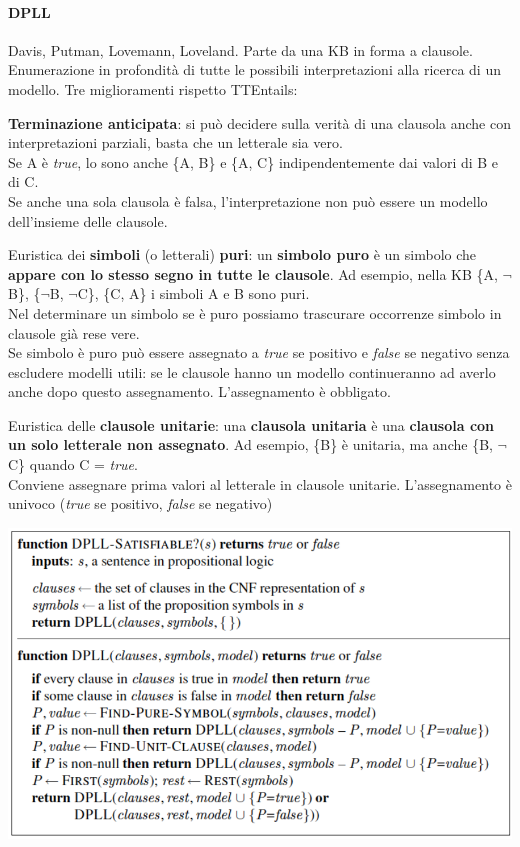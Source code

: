 \documentclass[10pt]{book}
\begin{document}
\paragraph{DPLL} Davis, Putman, Lovemann, Loveland. Parte da una KB in forma a clausole. Enumerazione in profondità di tutte le possibili interpretazioni alla ricerca di un modello. Tre miglioramenti rispetto TTEntails:
\begin{list}{}{}
	\item \textbf{Terminazione anticipata}: si può decidere sulla verità di una clausola anche con interpretazioni parziali, basta che un letterale sia vero.\\
	Se A è \textit{true}, lo sono anche \{A, B\} e \{A, C\} indipendentemente dai valori di B e di C.\\
	Se anche una sola clausola è falsa, l'interpretazione non può essere un modello dell'insieme delle clausole.
	\item Euristica dei \textbf{simboli} (o letterali) \textbf{puri}: un \textbf{simbolo puro} è un simbolo che \textbf{appare con lo stesso segno in tutte le clausole}. Ad esempio, nella KB \{A, $\neg$B\}, \{$\neg$B, $\neg$C\}, \{C, A\} i simboli A e B sono puri.\\
Nel determinare un simbolo se è puro possiamo trascurare occorrenze simbolo in clausole già rese vere.\\
	Se simbolo è puro può essere assegnato a \textit{true} se positivo e \textit{false} se negativo senza escludere modelli utili: se le clausole hanno un modello continueranno ad averlo anche dopo questo assegnamento. L'assegnamento è obbligato.
	\item Euristica delle \textbf{clausole unitarie}: una \textbf{clausola unitaria} è una \textbf{clausola con un solo letterale non assegnato}. Ad esempio, \{B\} è unitaria, ma anche \{B, $\neg$C\} quando C = \textit{true}.\\
	Conviene assegnare prima valori al letterale in clausole unitarie. L'assegnamento è univoco (\textit{true} se positivo, \textit{false} se negativo)
\end{list}
\begin{center}
	\includegraphics[scale=0.7]{dpllalgoritmo.png}
\end{center}
\end{document}
